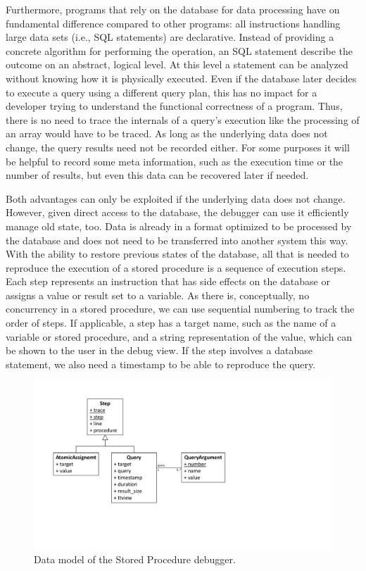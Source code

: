 Furthermore, programs that rely on the database for data processing have on fundamental difference compared to other programs:
all instructions handling large data sets (i.e., SQL statements) are declarative.
Instead of providing a concrete algorithm for performing the operation, an SQL statement describe the outcome on an abstract, logical level.
At this level a statement can be analyzed without knowing how it is physically executed.
Even if the database later decides to execute a query using a different query plan, this has no impact for a developer trying to understand the functional correctness of a program.
Thus, there is no need to trace the internals of a query's execution like the processing of an array would have to be traced.
As long as the underlying data does not change, the query results need not be recorded either.
For some purposes it will be helpful to record some meta information, such as the execution time or the number of results, but even this data can be recovered later if needed.

Both advantages can only be exploited if the underlying data does not change.
However, given direct access to the database, the debugger can use it efficiently manage old state, too.
Data is already in a format optimized to be processed by the database and does not need to be transferred into another system this way.
With the ability to restore previous states of the database, 
\tmpStart
all that is needed to reproduce the execution of a stored procedure is a sequence of execution steps.
Each step represents an instruction that has side effects on the database or assigns a value or result set to a variable.
As there is, conceptually, no concurrency in a stored procedure, we can use sequential numbering to track the order of steps.
If applicable, a step has a target name, such as the name of a variable or stored procedure, and a string representation of the value, which can be shown to the user in the debug view.
If the step involves a database statement, we also need a timestamp to be able to reproduce the query.
\tmpEnd

\begin{figure}
	\centering
		\includegraphics[width=0.9\linewidth]{img/model_sqlodb}
	\caption{Data model of the Stored Procedure debugger.}
	\label{fig:model_odb}
\end{figure}

